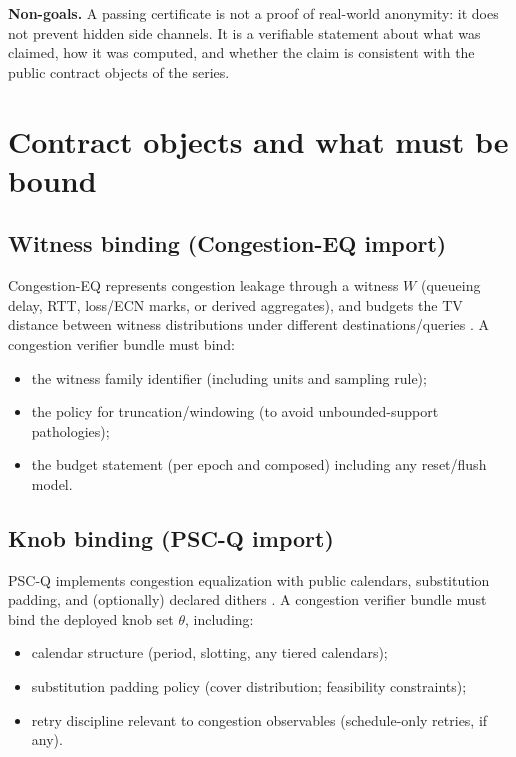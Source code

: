 \documentclass[11pt]{article}
\begin{document}
\textbf{Non-goals.}
A passing certificate is not a proof of real-world anonymity: it does not prevent hidden side channels.
It is a verifiable statement about what was claimed, how it was computed, and whether the claim is consistent with the public contract objects of the series.

\section{Contract objects and what must be bound}
\subsection{Witness binding (Congestion-EQ import)}
Congestion-EQ represents congestion leakage through a witness $W$ (queueing delay, RTT, loss/ECN marks, or derived aggregates), and budgets the TV distance between witness distributions under different destinations/queries \cite{series:congeq}.
A congestion verifier bundle must bind:
\begin{itemize}[leftmargin=1.2em]
\item the witness family identifier (including units and sampling rule);
\item the policy for truncation/windowing (to avoid unbounded-support pathologies);
\item the budget statement (per epoch and composed) including any reset/flush model.
\end{itemize}

\subsection{Knob binding (PSC-Q import)}
PSC-Q implements congestion equalization with public calendars, substitution padding, and (optionally) declared dithers \cite{series:pscq}.
A congestion verifier bundle must bind the deployed knob set $\theta$, including:
\begin{itemize}[leftmargin=1.2em]
\item calendar structure (period, slotting, any tiered calendars);
\item substitution padding policy (cover distribution; feasibility constraints);
\item retry discipline relevant to congestion observables (schedule-only retries, if any).
\end{itemize}
\end{document}
